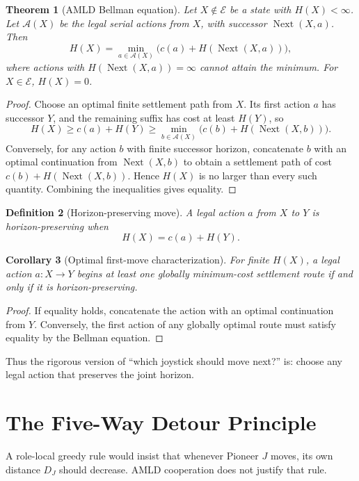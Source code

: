 \documentclass[11pt]{article}
\newtheorem{definition}{Definition}[section]
\newtheorem{theorem}[definition]{Theorem}
\newtheorem{corollary}[definition]{Corollary}
\theoremstyle{remark}
\newcommand{\Act}{\mathcal A}
\newcommand{\Exit}{\mathcal E}
\begin{document}
\begin{theorem}[AMLD Bellman equation]
Let $X\notin\Exit$ be a state with $H(X)<\infty$. Let $\Act(X)$ be the legal serial actions from $X$, with successor $\operatorname{Next}(X,a)$. Then
\[
\boxed{
H(X)=\min_{a\in\Act(X)}\bigl(c(a)+H(\operatorname{Next}(X,a))\bigr),
}
\]
where actions with $H(\operatorname{Next}(X,a))=\infty$ cannot attain the minimum. For $X\in\Exit$, $H(X)=0$.
\end{theorem}
\begin{proof}
Choose an optimal finite settlement path from $X$. Its first action $a$ has successor $Y$, and the remaining suffix has cost at least $H(Y)$, so
\[
H(X)\ge c(a)+H(Y)\ge \min_{b\in\Act(X)}\bigl(c(b)+H(\operatorname{Next}(X,b))\bigr).
\]
Conversely, for any action $b$ with finite successor horizon, concatenate $b$ with an optimal continuation from $\operatorname{Next}(X,b)$ to obtain a settlement path of cost $c(b)+H(\operatorname{Next}(X,b))$. Hence $H(X)$ is no larger than every such quantity. Combining the inequalities gives equality.
\end{proof}

\begin{definition}[Horizon-preserving move]
A legal action $a$ from $X$ to $Y$ is horizon-preserving when
\[
H(X)=c(a)+H(Y).
\]
\end{definition}

\begin{corollary}[Optimal first-move characterization]
For finite $H(X)$, a legal action $a:X\to Y$ begins at least one globally minimum-cost settlement route if and only if it is horizon-preserving.
\end{corollary}
\begin{proof}
If equality holds, concatenate the action with an optimal continuation from $Y$. Conversely, the first action of any globally optimal route must satisfy equality by the Bellman equation.
\end{proof}

Thus the rigorous version of ``which joystick should move next?'' is: choose any legal action that preserves the joint horizon.

\section{The Five-Way Detour Principle}

A role-local greedy rule would insist that whenever Pioneer $J$ moves, its own distance $D_J$ should decrease. AMLD cooperation does not justify that rule.
\end{document}
